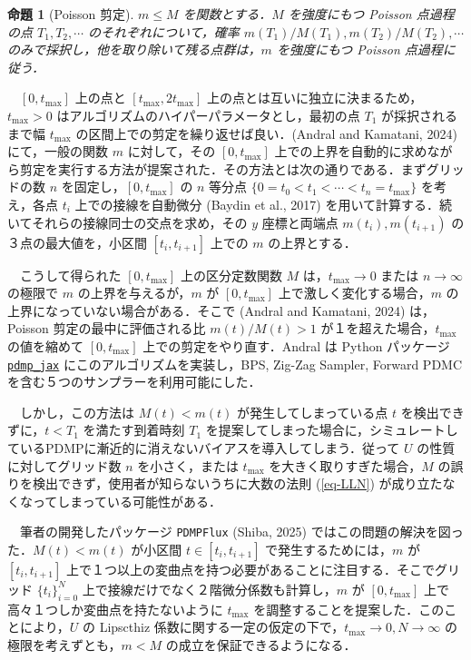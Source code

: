 \documentclass[
]{article}
\theoremstyle{StatementsWithUnderline}\newtheorem{theorem}{定理}[section]\newtheorem{definition}[theorem]{定義}\newtheorem{corollary}[theorem]{系}\newtheorem{proposition}[theorem]{命題}\newtheorem{lemma}[theorem]{補題}\newtheorem{example}[theorem]{例}
\theoremstyle{definition}\newtheorem{notation}[theorem]{記法}\newtheorem{algorithm}[theorem]{算譜}\newtheorem{remarks}[theorem]{要諦}\newtheorem{remark}[theorem]{注}
\begin{document}
\begin{proposition}[Poisson 剪定]\label{prop-thinning}
  $m\le M$ を関数とする．$M$ を強度にもつ Poisson 点過程の点 $T_1,T_2,\cdots$ のそれぞれについて，確率 $m(T_1)/M(T_1),m(T_2)/M(T_2),\cdots$ のみで採択し，他を取り除いて残る点群は，$m$ を強度にもつ Poisson 点過程に従う．
\end{proposition}

　\([0,t_{\text{max}}]\) 上の点と \([t_{\text{max}},2t_{\text{max}}]\)
上の点とは互いに独立に決まるため，\(t_{\text{max}}>0\)
はアルゴリズムのハイパーパラメータとし，最初の点 \(T_1\)
が採択されるまで幅 \(t_{\text{max}}\)
の区間上での剪定を繰り返せば良い．(Andral and Kamatani, 2024)
にて，一般の関数 \(m\) に対して，その \([0,t_{\text{max}}]\)
上での上界を自動的に求めながら剪定を実行する方法が提案された．その方法とは次の通りである．まずグリッドの数
\(n\) を固定し，\([0,t_{\text{max}}]\) の \(n\) 等分点
\(\{0=t_0<t_1<\cdots<t_n=t_{\text{max}}\}\) を考え，各点 \(t_i\)
上での接線を自動微分 (Baydin et al., 2017)
を用いて計算する．続いてそれらの接線同士の交点を求め，その \(y\)
座標と両端点 \(m(t_i),m(t_{i+1})\) の３点の最大値を，小区間
\([t_i,t_{i+1}]\) 上での \(m\) の上界とする．

　こうして得られた \([0,t_{\text{max}}]\) 上の区分定数関数 \(M\)
は，\(t_{\text{max}}\to0\) または \(n\to\infty\) の極限で \(m\)
の上界を与えるが，\(m\) が \([0,t_{\text{max}}]\)
上で激しく変化する場合，\(m\) の上界になっていない場合がある．そこで
(Andral and Kamatani, 2024) は，Poisson 剪定の最中に評価される比
\(m(t)/M(t)>1\) が１を超えた場合，\(t_{\text{max}}\) の値を縮めて
\([0,t_{\text{max}}]\) 上での剪定をやり直す．Andral は Python パッケージ
\href{https://github.com/charlyandral/pdmp_jax}{\texttt{pdmp\_jax}}
にこのアルゴリズムを実装し，BPS, Zig-Zag Sampler, Forward PDMC
を含む５つのサンプラーを利用可能にした．

　しかし，この方法は \(M(t)<m(t)\) が発生してしまっている点 \(t\)
を検出できずに，\(t<T_1\) を満たす到着時刻 \(T_1\)
を提案してしまった場合に，シミュレートしているPDMPに漸近的に消えないバイアスを導入してしまう．従って
\(U\) の性質に対してグリッド数 \(n\) を小さく，または \(t_{\text{max}}\)
を大きく取りすぎた場合，\(M\)
の誤りを検出できず，使用者が知らないうちに大数の法則 (\ref{eq-LLN})
が成り立たなくなってしまっている可能性がある．

　筆者の開発したパッケージ \texttt{PDMPFlux} (Shiba, 2025)
ではこの問題の解決を図った．\(M(t)<m(t)\) が小区間 \(t\in[t_i,t_{i+1}]\)
で発生するためには，\(m\) が \([t_i,t_{i+1}]\)
上で１つ以上の変曲点を持つ必要があることに注目する．そこでグリッド
\(\{t_i\}_{i=0}^N\) 上で接線だけでなく２階微分係数も計算し，\(m\) が
\([0,t_{\text{max}}]\) 上で高々１つしか変曲点を持たないように
\(t_{\text{max}}\) を調整することを提案した．このことにより，\(U\) の
Lipscthiz
係数に関する一定の仮定の下で，\(t_{\text{max}}\to0,N\to\infty\)
の極限を考えずとも，\(m<M\) の成立を保証できるようになる．
\end{document}
